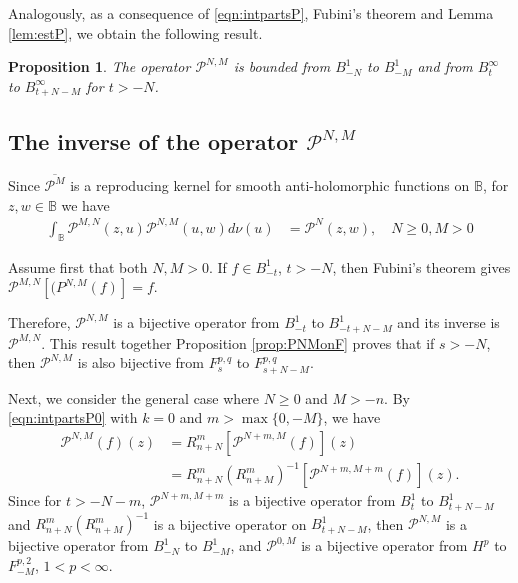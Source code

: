 \documentclass[12pt,twoside,leqno,final]{amsart}
\theoremstyle{plain}
\newtheorem{prop}[thm]{Proposition}
\begin{document}
Analogously, as a consequence of \eqref{eqn:intpartsP}, Fubini's theorem and Lemma \ref{lem:estP}, we obtain the following result.

\begin{prop}\label{prop:PNMonB}
The operator ${{\mathcal P}}^{N,M}$ is  bounded  from 
$B^1_{-N}$ to $B^1_{-M}$ and from $B^\infty_{t}$ to $B^\infty_{t+N-M}$ for $t>-N$.
\end{prop}

\subsection{The inverse of the operator ${{\mathcal P}}^{N,M}$} \label{subsec:invPNM}\quad\par

Since $\overline{{{\mathcal P}}^M}$ is a reproducing kernel 
for smooth  anti-holomorphic functions on ${{\mathbb B}}$, for $z,w\in {{\mathbb B}}$ we have
\begin{equation} \label{eqn:intPNM}\begin{split}
\int_{{\mathbb B}} {{\mathcal P}}^{M,N}(z,u){{\mathcal P}}^{N,M}(u,w)d\nu(u)&={{\mathcal P}}^N(z,w),\quad N\ge 0, M>0
\end{split}\end{equation}

Assume first that both $N, M>0$. If $f\in B^1_{-t}$, $t>-N$, then Fubini's theorem gives
${{\mathcal P}}^{M,N}[(P^{N,M}(f)]=f$.  

Therefore, 
${{\mathcal P}}^{N,M}$ is a bijective operator from $B^1_{-t}$ to $B^1_{-t+N-M}$ and its inverse is ${{\mathcal P}}^{M,N}$.
This result together Proposition \ref{prop:PNMonF} proves that if $s>-N$, then ${{\mathcal P}}^{N,M}$ 
is also bijective from $F^{p,q}_s$ to $F^{p,q}_{s+N-M}$.

Next, we consider the general case where $N\ge 0$ and $M>-n$. By \eqref{eqn:intpartsP0} with $k=0$ and $m>\max\{0,-M\}$,  
 we have 
\begin{align*}
{{\mathcal P}}^{N,M}(f)(z)&=R^{m}_{n+N}\left[{{\mathcal P}}^{N+m,M} (f)\right](z)\\
&=R^{m}_{n+N}(R^{m}_{n+M})^{-1} \left[{{\mathcal P}}^{N+m,M+m} (f)\right](z).
\end{align*}
Since for $t>-N-m$, ${{\mathcal P}}^{N+m,M+m}$ is a bijective operator from $B^1_t$ to $B^1_{t+N-M}$ and 
$R^{m}_{n+N}(R^{m}_{n+M})^{-1}$ is a bijective operator on $B^1_{t+N-M}$, then ${{\mathcal P}}^{N,M}$ 
is a bijective operator from $B^1_{-N}$ to $B^1_{-M}$, and ${{\mathcal P}}^{0,M}$ is a bijective operator 
from $H^p$ to $F^{p,2}_{-M}$, $1<p<\infty$.
\end{document}
